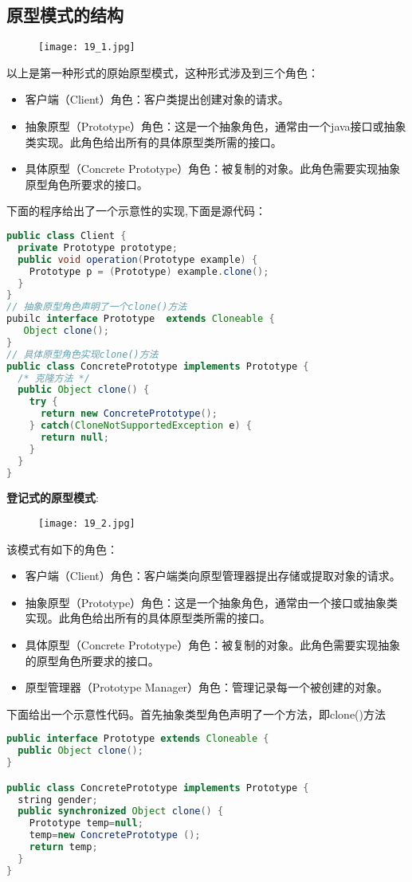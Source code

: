 \documentclass[../main.tex]{subfiles}
\begin{document}
\subsection{原型模式的结构}
\begin{figure}[H]
  \texttt{[image: 19\_1.jpg]}
\end{figure}
以上是第一种形式的原始原型模式，这种形式涉及到三个角色：
\begin{itemize}
  \item 客户端（Client）角色：客户类提出创建对象的请求。
  \item 抽象原型（Prototype）角色：这是一个抽象角色，通常由一个java接口或抽象类实现。此角色给出所有的具体原型类所需的接口。
  \item 具体原型（Concrete Prototype）角色：被复制的对象。此角色需要实现抽象原型角色所要求的接口。
\end{itemize}
%
下面的程序给出了一个示意性的实现,下面是源代码：
\begin{lstlisting}[language=java]
public class Client {
  private Prototype prototype;
  public void operation(Prototype example) {
    Prototype p = (Prototype) example.clone();
  }
}
// 抽象原型角色声明了一个clone()方法
pubilc interface Prototype  extends Cloneable {
   Object clone();
}
// 具体原型角色实现clone()方法
public class ConcretePrototype implements Prototype {
  /* 克隆方法 */
  public Object clone() {
    try {
      return new ConcretePrototype();
    } catch(CloneNotSupportedException e) {
      return null;
    }
  }
}
\end{lstlisting}
%
\textbf{登记式的原型模式}:
\begin{figure}[H]
  \texttt{[image: 19\_2.jpg]}
\end{figure}
该模式有如下的角色：
\begin{itemize}
  \item 客户端（Client）角色：客户端类向原型管理器提出存储或提取对象的请求。
  \item 抽象原型（Prototype）角色：这是一个抽象角色，通常由一个接口或抽象类实现。此角色给出所有的具体原型类所需的接口。
  \item 具体原型（Concrete Prototype）角色：被复制的对象。此角色需要实现抽象的原型角色所要求的接口。
  \item 原型管理器（Prototype Manager）角色：管理记录每一个被创建的对象。
\end{itemize}
%
下面给出一个示意性代码。首先抽象类型角色声明了一个方法，即clone()方法
\begin{lstlisting}[language=java]
public interface Prototype extends Cloneable {
  public Object clone();
}

public class ConcretePrototype implements Prototype {
  string gender;
  public synchronized Object clone() {
    Prototype temp=null;
    temp=new ConcretePrototype ();
    return temp;
  }
}
\end{lstlisting}
\end{document}
